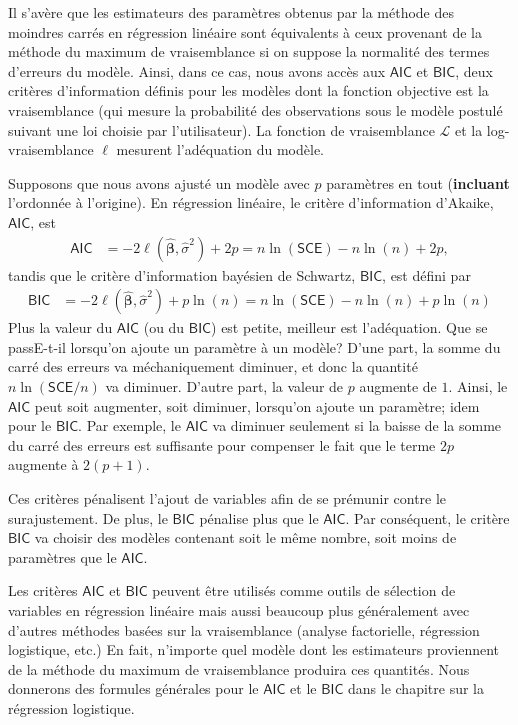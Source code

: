 \documentclass[
  11pt,
  letterpaper,
]{book}
\theoremstyle{definition}
\theoremstyle{definition}
\theoremstyle{definition}
\theoremstyle{remark}
\begin{document}
Il s'avère que les estimateurs des paramètres obtenus par la méthode des moindres carrés en régression linéaire sont équivalents à ceux provenant de la méthode du maximum de vraisemblance si on suppose la normalité des termes d'erreurs du modèle. Ainsi, dans ce cas, nous avons accès aux \(\mathsf{AIC}\) et \(\mathsf{BIC}\), deux critères d'information définis pour les modèles dont la fonction objective est la vraisemblance (qui mesure la probabilité des observations sous le modèle postulé suivant une loi choisie par l'utilisateur). La fonction de vraisemblance \(\mathcal{L}\) et la log-vraisemblance \(\ell\) mesurent l'adéquation du modèle.

Supposons que nous avons ajusté un modèle avec \(p\) paramètres en tout (\textbf{incluant} l'ordonnée à l'origine). En régression linéaire, le critère d'information d'Akaike, \(\mathsf{AIC}\), est
\begin{align*}
\mathsf{AIC} &=-2 \ell(\widehat{\boldsymbol{\beta}}, \widehat{\sigma}^2) +2p=n \ln (\mathsf{SCE}) - n\ln(n) + 2p,
\end{align*}
tandis que le critère d'information bayésien de Schwartz, \(\mathsf{BIC}\), est défini par
\begin{align*}
\mathsf{BIC} &=-2 \ell(\widehat{\boldsymbol{\beta}}, \widehat{\sigma}^2) + p\ln(n)=n \ln (\mathsf{SCE}) - n\ln(n) + p\ln(n)
\end{align*}
Plus la valeur du \(\mathsf{AIC}\) (ou du \(\mathsf{BIC}\)) est petite, meilleur est l'adéquation. Que se passE-t-il lorsqu'on ajoute un paramètre à un modèle? D'une part, la somme du carré des erreurs va méchaniquement diminuer, et donc la quantité \(n \ln (\mathsf{SCE}/n)\) va diminuer. D'autre part, la valeur de \(p\) augmente de \(1\). Ainsi, le \(\mathsf{AIC}\) peut soit augmenter, soit diminuer, lorsqu'on ajoute un paramètre; idem pour le \(\mathsf{BIC}\). Par exemple, le \(\mathsf{AIC}\) va diminuer seulement si la baisse de la somme du carré des erreurs est suffisante pour compenser le fait que le terme \(2p\) augmente à \(2 (p+1)\).

Ces critères pénalisent l'ajout de variables afin de se prémunir contre le surajustement. De plus, le \(\mathsf{BIC}\) pénalise plus que le \(\mathsf{AIC}\). Par conséquent, le critère \(\mathsf{BIC}\) va choisir des modèles contenant soit le même nombre, soit moins de paramètres que le \(\mathsf{AIC}\).

Les critères \(\mathsf{AIC}\) et \(\mathsf{BIC}\) peuvent être utilisés comme outils de sélection de variables en régression linéaire mais aussi beaucoup plus généralement avec d'autres méthodes basées sur la vraisemblance (analyse factorielle, régression logistique, etc.) En fait, n'importe quel modèle dont les estimateurs proviennent de la méthode du maximum de vraisemblance produira ces quantités. Nous donnerons des formules générales pour le \(\mathsf{AIC}\) et le \(\mathsf{BIC}\) dans le chapitre sur la régression logistique.
\end{document}
